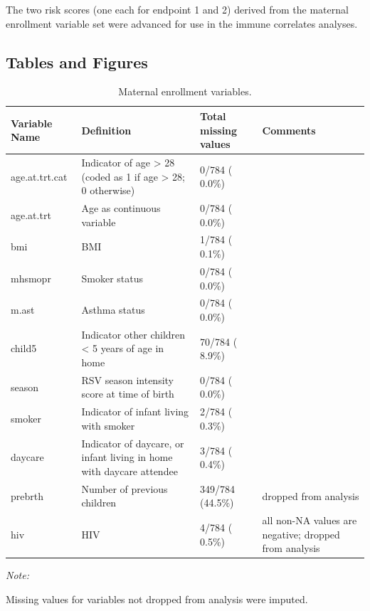 \documentclass[11pt]{article}
\begin{document}
The two risk scores (one each for endpoint 1 and 2) derived from the maternal enrollment variable set were advanced for use in the immune correlates analyses.

\clearpage

\hypertarget{tables-and-figures}{%
\subsection{Tables and Figures}\label{tables-and-figures}}

\begin{table}[!h]

\caption{\label{tab:maternalVarstable}Maternal enrollment variables. \label{tab:matVarstable}}
\centering
\fontsize{9}{11}\selectfont
\begin{threeparttable}
\begin{tabular}[t]{l>{\raggedright\arraybackslash}p{3cm}l>{\raggedright\arraybackslash}p{3cm}}
\toprule
Variable Name & Definition & Total missing values & Comments\\
\midrule
age.at.trt.cat & Indicator of age > 28 (coded as 1 if age > 28; 0 otherwise) & 0/784 ( 0.0\%) & \\
age.at.trt & Age as continuous variable & 0/784 ( 0.0\%) & \\
bmi & BMI & 1/784 ( 0.1\%) & \\
mhsmopr & Smoker status & 0/784 ( 0.0\%) & \\
m.ast & Asthma status & 0/784 ( 0.0\%) & \\
child5 & Indicator other children < 5 years of age in home & 70/784 ( 8.9\%) & \\
season & RSV season intensity score at time of birth & 0/784 ( 0.0\%) & \\
smoker & Indicator of infant living with smoker & 2/784 ( 0.3\%) & \\
daycare & Indicator of daycare, or infant living in home with daycare attendee & 3/784 ( 0.4\%) & \\
prebrth & Number of previous children & 349/784 (44.5\%) & dropped from analysis\\
hiv & HIV & 4/784 ( 0.5\%) & all non-NA values are negative; dropped from analysis\\
\bottomrule
\end{tabular}
\begin{tablenotes}
\item \textit{Note: } 
\item Missing values for variables not dropped from analysis were imputed.
\end{tablenotes}
\end{threeparttable}
\end{table}
\end{document}
